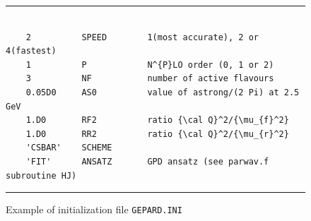 \documentclass[12pt]{article}
\begin{document}
\begin{figure}[t]
\begin{center}
\hrule
\begin{verbatim}

    2          SPEED        1(most accurate), 2 or 4(fastest)
    1          P            N^{P}LO order (0, 1 or 2)
    3          NF           number of active flavours
    0.05D0     AS0          value of astrong/(2 Pi) at 2.5 GeV
    1.D0       RF2          ratio {\cal Q}^2/{\mu_{f}^2}
    1.D0       RR2          ratio {\cal Q}^2/{\mu_{r}^2}
    'CSBAR'    SCHEME       
    'FIT'      ANSATZ       GPD ansatz (see parwav.f subroutine HJ)

\end{verbatim}
\hrule
\end{center}
\caption{Example of initialization file \texttt{GEPARD.INI}}
\label{fig:GEPARD.INI}
\end{figure}
\end{document}
